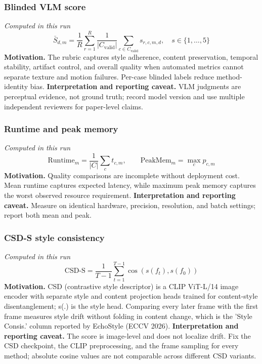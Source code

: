 \documentclass[10pt]{article}
\begin{document}
\subsubsection*{Blinded VLM score}
\textit{Computed in this run}
\begin{equation*}
\bar S_{d,m}=\frac{1}{R}\sum_{r=1}^{R}\frac{1}{|C_{\mathrm{valid}}|}\sum_{c\in C_{\mathrm{valid}}}s_{r,c,m,d},\quad s\in\{1,\ldots,5\}
\end{equation*}
\textbf{Motivation.} The rubric captures style adherence, content preservation, temporal stability, artifact control, and overall quality when automated metrics cannot separate texture and motion failures. Per-case blinded labels reduce method-identity bias.
\textbf{Interpretation and reporting caveat.} VLM judgments are perceptual evidence, not ground truth; record model version and use multiple independent reviewers for paper-level claims.
\subsubsection*{Runtime and peak memory}
\textit{Computed in this run}
\begin{equation*}
\mathrm{Runtime}_m=\frac{1}{|C|}\sum_c t_{c,m},\qquad \mathrm{PeakMem}_m=\max_c p_{c,m}
\end{equation*}
\textbf{Motivation.} Quality comparisons are incomplete without deployment cost. Mean runtime captures expected latency, while maximum peak memory captures the worst observed resource requirement.
\textbf{Interpretation and reporting caveat.} Measure on identical hardware, precision, resolution, and batch settings; report both mean and peak.
\subsubsection*{CSD-S style consistency}
\textit{Computed in this run}
\begin{equation*}
\mathrm{CSD\text{-}S}=\frac{1}{T-1}\sum_{t=1}^{T-1}\cos\!\left(s(f_t),s(f_0)\right)
\end{equation*}
\textbf{Motivation.} CSD (contrastive style descriptor) is a CLIP ViT-L/14 image encoder with separate style and content projection heads trained for content-style disentanglement; s(.) is the style head. Comparing every later frame with the first frame measures style drift without folding in content change, which is the 'Style Consis.' column reported by EchoStyle (ECCV 2026).
\textbf{Interpretation and reporting caveat.} The score is image-level and does not localize drift. Fix the CSD checkpoint, the CLIP preprocessing, and the frame sampling for every method; absolute cosine values are not comparable across different CSD variants.
\end{document}
